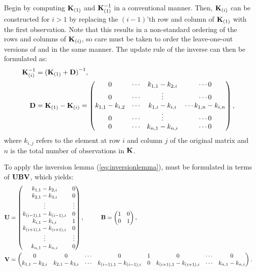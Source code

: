 \documentclass[a4paper]{vanvliet_paper}
\begin{document}
Begin by computing $\mathbf{K}_{(1)}$ and $\mathbf{K}_{(1)}^{-1}$ in a conventional manner. Then, $\mathbf{K}_{(i)}$ can be constructed for $i > 1$ by replacing the $(i-1)$'th row and column of $\mathbf{K}_{(1)}$ with the first observation.
Note that this results in a non-standard ordering of the rows and columns of $\mathbf{K}_{(i)}$, so care must be taken to order the leave-one-out versions of  and  in the same manner.
The update rule of the inverse can then be formulated as:
\begin{align}
    \mathbf{K}_{(i)}^{-1} &= {(\mathbf{K}_{(1)} + \mathbf{D})}^{-1}, \\
    \mathbf{D} &= \mathbf{K}_{(1)} - \mathbf{K}_{(i)} =
    \begin{pmatrix}
        0 & \cdots & k_{1,1} - k_{2,i} & \cdots 0 \\
        0 & \cdots & \vdots & \cdots 0 \\
        k_{1,1} - k_{i,2} & \cdots & k_{1,i} - k_{i,i} & \cdots k_{1,n} - k_{i,n} \\
        0 & \cdots & \vdots & \cdots 0 \\
        0 & \cdots & k_{n,1} - k_{n,i} & \cdots 0
    \end{pmatrix},
\end{align}
where $k_{i,j}$ refers to the element at row $i$ and column $j$ of the original matrix  and $n$ is the total number of observations in $\mathbf{K}$.

To apply the inversion lemma (\autoref{eq:inversionlemma}),  must be formulated in terms of $\mathbf{U}\mathbf{B}\mathbf{V}$, which yields:
\begin{align}
    \mathbf{U} &= \begin{pmatrix}
        k_{1,1} - k_{2,i} & 0 \\
        k_{2,1} - k_{3,i} & 0 \\
        \vdots & \vdots \\
        k_{(i-1),1} - k_{(i-1),i} & 0 \\
        k_{i,1} - k_{i,i} & 1 \\
        k_{(i+1),1} - k_{(i+1),i} & 0 \\
        \vdots & \vdots \\
        k_{n,1} - k_{n,i} & 0
    \end{pmatrix}, \hspace{1cm}
    \mathbf{B} = \begin{pmatrix}
        1 & 0 \\
        0 & 1 \\
    \end{pmatrix},\\
    \mathbf{V} &= \begin{pmatrix}
        0 & 0 & \cdots & 0 & 1 & 0 & \cdots & 0 \\
        k_{1,1} - k_{2,i} & k_{2,1} - k_{3,i} & \cdots &
        k_{(i-1),1} - k_{(i-1),i} & 0 & k_{(i+1),1} - k_{(i+1),i} &
        \cdots & k_{n,1} - k_{n,i}
    \end{pmatrix}.
\end{align}
\end{document}
